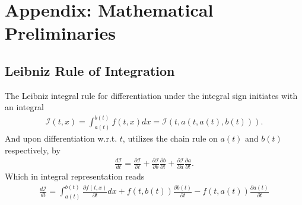 \appendix
\section{Appendix: Mathematical Preliminaries}
\subsection{Leibniz Rule of Integration}
\label{appendix:leibniz}
The Leibniz integral rule for differentiation under the integral sign
initiates with an integral
\begin{align}
    \mathcal{I}(t, x) = \int_{a(t)}^{b(t)} f(t, x) dx = \mathcal{I}(t, a(t,
    a(t), b(t))).
\end{align}
And upon differentiation w.r.t. $t$, utilizes the chain rule on $a(t)$ and
$b(t)$ respectively, by
\begin{align}
    \frac{d\mathcal{I}}{dt} =
    \frac{\partial \mathcal{I}}{\partial t}+
    \frac{\partial \mathcal{I}}{\partial b}\frac{\partial b}{\partial t}+
    \frac{\partial \mathcal{I}}{\partial a}\frac{\partial a}{\partial t}.
\end{align}
Which in integral representation reads
\begin{align}
    \frac{d\mathcal{I}}{dt} = \int_{a(t)}^{b(t)}\frac{\partial f(t,
    x)}{\partial t} dx + f(t, b(t)) \frac{\partial b(t)}{\partial t}
    - f(t, a(t)) \frac{\partial a(t)}{\partial t}
\end{align}

